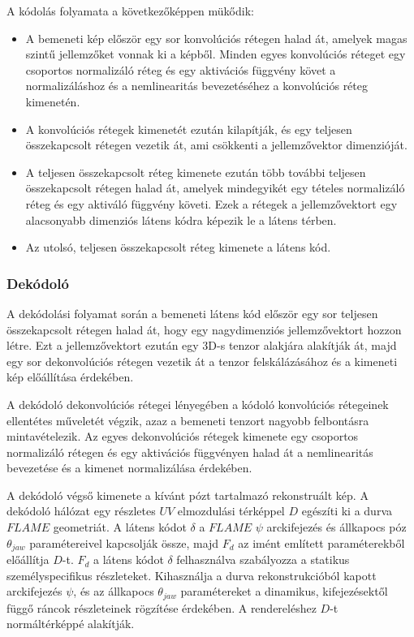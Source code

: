 \documentclass[12pt,a4]{article}
\begin{document}
    
                A kódolás folyamata a következőképpen mükődik:
                \begin{itemize}
    	           \item A bemeneti kép először egy sor konvolúciós rétegen halad át, amelyek magas szintű jellemzőket vonnak ki a képből. Minden egyes konvolúciós réteget egy csoportos normalizáló réteg és egy aktivációs függvény követ a normalizáláshoz és a nemlinearitás bevezetéséhez a konvolúciós réteg kimenetén.
                
    	           \item A konvolúciós rétegek kimenetét ezután kilapítják, és egy teljesen összekapcsolt rétegen vezetik át, ami csökkenti a jellemzővektor dimenzióját.
                
    	           \item A teljesen összekapcsolt réteg kimenete ezután több további teljesen összekapcsolt rétegen halad át, amelyek mindegyikét egy tételes normalizáló réteg és egy aktiváló függvény követi. Ezek a rétegek a jellemzővektort egy alacsonyabb dimenziós látens kódra képezik le a látens térben.
                
    	           \item Az utolsó, teljesen összekapcsolt réteg kimenete a látens kód.
    	           
                \end{itemize}
    
            \subsubsection{Dekódoló} \label{Dekódoló}
    
                A dekódolási folyamat során a bemeneti látens kód először egy sor teljesen összekapcsolt rétegen halad át, hogy egy nagydimenziós jellemzővektort hozzon létre. Ezt a jellemzővektort ezután egy 3D-s tenzor alakjára alakítják át, majd egy sor dekonvolúciós rétegen vezetik át a tenzor felskálázásához és a kimeneti kép előállítása érdekében.
    
                A dekódoló dekonvolúciós rétegei lényegében a kódoló konvolúciós rétegeinek ellentétes műveletét végzik, azaz a bemeneti tenzort nagyobb felbontásra mintavételezik. Az egyes dekonvolúciós rétegek kimenete egy csoportos normalizáló rétegen és egy aktivációs függvényen halad át a nemlinearitás bevezetése és a kimenet normalizálása érdekében.
    
                A dekódoló végső kimenete a kívánt pózt tartalmazó rekonstruált kép. A dekódoló hálózat egy részletes $UV$ elmozdulási térképpel $D$ egészíti ki a durva $FLAME$ geometriát. A látens kódot $\delta$
     	        a $FLAME$ $\psi$ arckifejezés és állkapocs póz $\theta_{jaw}$ paramétereivel kapcsolják
     	          össze, majd $F_{d}$ az imént említett paraméterekből előállítja $D$-t. 
                $F_{d}$ a látens kódot $\delta$ felhasználva szabályozza a statikus személyspecifikus részleteket. Kihasználja a durva rekonstrukcióból kapott arckifejezés $\psi$, és az állkapocs $\theta_{jaw}$ paramétereket a dinamikus, kifejezésektől függő ráncok részleteinek rögzítése érdekében. A rendereléshez $D$-t normáltérképpé alakítják.
\end{document}
